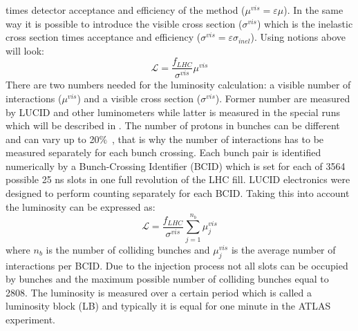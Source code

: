 times detector acceptance and efficiency of the method ($\mu^{vis} = \varepsilon \mu$).
In the same way it is possible to introduce the visible cross section ($\sigma^{vis}$) which is the inelastic 
cross section times acceptance and efficiency ($\sigma^{vis} = \varepsilon \sigma_{inel}$).
Using notions above  will look:
\begin{equation}
\mathscr{L} = \dfrac{f_{LHC}}{\sigma^{vis}} \mu^{vis}
\label{eq:lumi_bunch_sum_visible}
\end{equation}
There are two numbers needed for the luminosity calculation: a visible number of interactions ($\mu^{vis}$) and a visible cross section ($\sigma^{vis}$). 
Former number are measured by LUCID and other luminometers while latter is measured in the special runs which will be described in . 
The number of protons in bunches can be different and can vary up to 20$\%$~\cite{Aad:2013ucp}, that is why the number of interactions has to be measured separately for each bunch crossing. Each bunch pair is identified numerically by a Bunch-Crossing Identifier (BCID) which is set for each of 3564 possible 25 ns slots in one full revolution of the LHC fill.
LUCID electronics were designed to perform counting separately for each BCID. 
Taking this into account the luminosity can be expressed as:
\begin{equation}
\mathscr{L} = \dfrac{f_{LHC}}{\sigma^{vis}} \sum_{j=1}^{n_{b}} \mu_{j}^{vis}
\label{eq:lumi_bunch_sum}
\end{equation}
where $n_{b}$ is the number of colliding bunches and $\mu_{j}^{vis}$ is the average number of interactions per BCID.
Due to the injection process not all slots can be occupied by bunches and the maximum possible number of colliding bunches equal to 2808.
The luminosity is measured over a certain period which is called a luminosity block (LB) and typically it is equal for one minute in the ATLAS experiment. 

